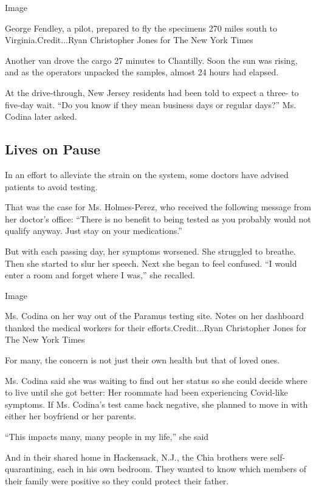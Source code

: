 Image

George Fendley, a pilot, prepared to fly the specimens 270 miles south
to Virginia.Credit...Ryan Christopher Jones for The New York Times

Another van drove the cargo 27 minutes to Chantilly. Soon the sun was
rising, and as the operators unpacked the samples, almost 24 hours had
elapsed.

At the drive-through, New Jersey residents had been told to expect a
three- to five-day wait. ``Do you know if they mean business days or
regular days?'' Ms. Codina later asked.

\hypertarget{lives-on-pause}{%
\subsection{Lives on Pause}\label{lives-on-pause}}

In an effort to alleviate the strain on the system, some doctors have
advised patients to avoid testing.

That was the case for Ms. Holmes-Perez, who received the following
message from her doctor's office: ``There is no benefit to being tested
as you probably would not qualify anyway. Just stay on your
medications.''

But with each passing day, her symptoms worsened. She struggled to
breathe. Then she started to slur her speech. Next she began to feel
confused. ``I would enter a room and forget where I was,'' she recalled.

Image

Ms. Codina on her way out of the Paramus testing site. Notes on her
dashboard thanked the medical workers for their efforts.Credit...Ryan
Christopher Jones for The New York Times

For many, the concern is not just their own health but that of loved
ones.

Ms. Codina said she was waiting to find out her status so she could
decide where to live until she got better: Her roommate had been
experiencing Covid-like symptoms. If Ms. Codina's test came back
negative, she planned to move in with either her boyfriend or her
parents.

``This impacts many, many people in my life,'' she said

And in their shared home in Hackensack, N.J., the Chia brothers were
self-quarantining, each in his own bedroom. They wanted to know which
members of their family were positive so they could protect their
father.

